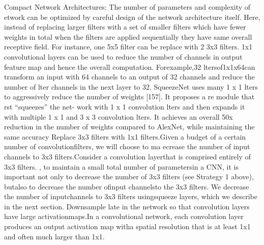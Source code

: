 Compact Network Architectures: The number of parameters and complexity of etwork can be optimized by careful design of the network architecture itself.
Here, instead of replacing larger filters with a set of smaller filters which have fewer weights in total when the filters are applied sequentially they have same overall receptive field.
For instance, one 5x5 filter can be replace with 2 3x3 filters. 1x1 convolutional layers can be used to reduce the number of channels in output feature map and hence the overall computation.
Forexample,32 ltersof1x1x64can transform an input with 64 channels to an output of 32 channels and reduce the number of  lter channels in the next layer to 32. SqueezeNet uses many 1 x 1  lters to aggressively reduce the number of weights [157]. It proposes a  re module that  rst “squeezes” the net- work with 1 x 1 convolution  lters and then expands it with multiple 1 x 1 and 3 x 3 convolution  lters.
It achieves an overall 50x reduction in the number of weights compared to AlexNet, while maintaining the same accuracy
Replace 3x3 filters with 1x1 filters.Given a budget of a certain number of convolutionfilters,  we will choose to ma
ecrease the number of input channels to 3x3 filters.Consider a convolution layerthat is comprised entirely of 3x3 filters. , to maintain a small total number of parametersin a CNN, it is important not only to decrease the number of 3x3 filters (see Strategy 1 above), butalso to decrease the number ofinput channelsto the 3x3 filters.  We decrease the number of inputchannels to 3x3 filters usingsqueeze layers, which we describe in the next section.
Downsample late in the network so that convolution layers have large activationmaps.In a convolutional network, each convolution layer produces an output activation map witha spatial resolution that is at least 1x1 and often much larger than 1x1.


